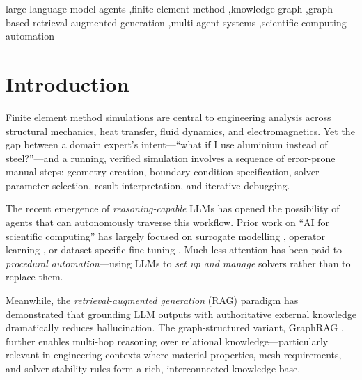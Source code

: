 \documentclass[preprint,review,12pt]{elsarticle}
\begin{document}
\begin{frontmatter}
\begin{keyword}
large language model agents \sep finite element method \sep knowledge graph
\sep graph-based retrieval-augmented generation \sep multi-agent systems
\sep scientific computing automation
\end{keyword}

\end{frontmatter}

\linenumbers

\section{Introduction}
\label{sec:intro}

Finite element method simulations are central to engineering analysis across
structural mechanics, heat transfer, fluid dynamics, and electromagnetics.
Yet the gap between a domain expert's intent—``what if I use aluminium instead
of steel?''—and a running, verified simulation involves a sequence of error-prone
manual steps: geometry creation, boundary condition specification, solver
parameter selection, result interpretation, and iterative debugging.

The recent emergence of \emph{reasoning-capable} LLMs \citep{brown2020gpt3,
wei2022cot, yao2023react} has opened the possibility of agents that can
autonomously traverse this workflow.  Prior work on ``AI for scientific
computing'' has largely focused on surrogate modelling
\citep{lagaris1998neural, raissi2019pinn, karniadakis2021physics}, operator
learning \citep{li2021fno}, or dataset-specific fine-tuning
\citep{jumper2021alphafold}.  Much less attention has been paid to
\emph{procedural automation}—using LLMs to \emph{set up and manage} solvers
rather than to replace them.

Meanwhile, the \emph{retrieval-augmented generation} (RAG) paradigm
\citep{lewis2020rag} has demonstrated that grounding LLM outputs with
authoritative external knowledge dramatically reduces hallucination.  The
graph-structured variant, GraphRAG \citep{edge2024graphrag}, further enables
multi-hop reasoning over relational knowledge—particularly relevant in
engineering contexts where material properties, mesh requirements, and solver
stability rules form a rich, interconnected knowledge base.
\end{document}
